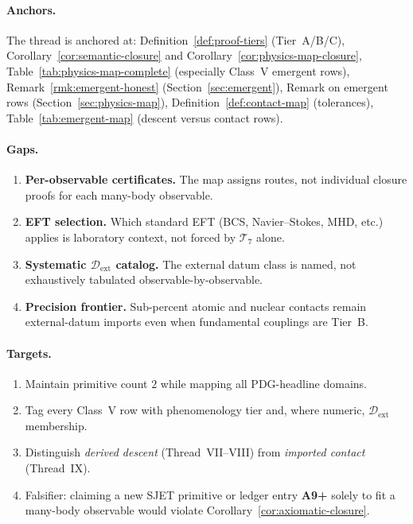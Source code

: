 \paragraph{Anchors.}
The thread is anchored at:
Definition~\ref{def:proof-tiers} (Tier~A/B/C),
Corollary~\ref{cor:semantic-closure} and Corollary~\ref{cor:physics-map-closure},
Table~\ref{tab:physics-map-complete} (especially Class~V emergent rows),
Remark~\ref{rmk:emergent-honest} (Section~\ref{sec:emergent}),
Remark on emergent rows (Section~\ref{sec:physics-map}),
Definition~\ref{def:contact-map} (tolerances),
Table~\ref{tab:emergent-map} (descent versus contact rows).

\paragraph{Gaps.}
\begin{enumerate}[label=(\roman*),leftmargin=*]
  \item \textbf{Per-observable certificates.} The map assigns routes, not
    individual closure proofs for each many-body observable.
  \item \textbf{EFT selection.} Which standard EFT (BCS, Navier--Stokes, MHD,
    etc.) applies is laboratory context, not forced by $\mathcal{T}_7$ alone.
  \item \textbf{Systematic $\mathcal{D}_{\mathrm{ext}}$ catalog.} The external
    datum class is named, not exhaustively tabulated observable-by-observable.
  \item \textbf{Precision frontier.} Sub-percent atomic and nuclear contacts
    remain external-datum imports even when fundamental couplings are Tier~B.
\end{enumerate}

\paragraph{Targets.}
\begin{enumerate}[label=(\roman*),leftmargin=*]
  \item Maintain primitive count $2$ while mapping all PDG-headline domains.
  \item Tag every Class~V row with phenomenology tier and, where numeric,
    $\mathcal{D}_{\mathrm{ext}}$ membership.
  \item Distinguish \emph{derived descent} (Thread~VII--VIII) from
    \emph{imported contact} (Thread~IX).
  \item Falsifier: claiming a new SJET primitive or ledger entry
    \textbf{A9+} solely to fit a many-body observable would violate
    Corollary~\ref{cor:axiomatic-closure}.
\end{enumerate}


